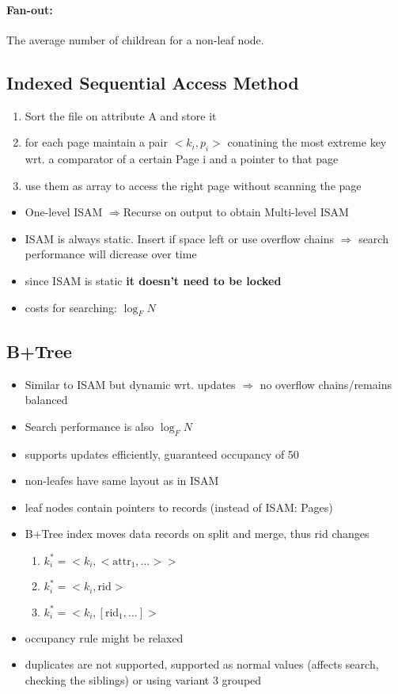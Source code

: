  \paragraph{Fan-out:} The average number of childrean for a non-leaf node.
 
 \subsection{Indexed Sequential Access Method}

  \begin{enumerate}
     \item Sort the file on attribute A and store it
     \item for each page maintain a pair $<k_i,p_i>$ conatining the most extreme key wrt. a comparator of a certain Page i and a pointer to that page
     \item use them as array to access the right page without scanning the page
 \end{enumerate}
 \begin{itemize}
    \item One-level ISAM $\Rightarrow$Recurse on output to obtain Multi-level ISAM
     \item ISAM is always static. Insert if space left or use overflow chains $\Rightarrow$ search performance will dicrease over time
     \item since ISAM is static \textbf{it doesn't need to be locked}
     \item costs for searching: $\log_F N$
 \end{itemize}

 \subsection{B+Tree}
\begin{itemize}
    \item Similar to ISAM but dynamic wrt. updates $\Rightarrow$ no overflow chains/remains balanced
    \item Search performance is also $\log_F N$
    \item supports updates efficiently, guaranteed occupancy of 50%
    \item non-leafes have same layout as in ISAM
    \item leaf nodes contain pointers to records (instead of ISAM: Pages)
    \item B+Tree index moves data records on split and merge, thus rid changes
    \begin{enumerate}
        \item $k_i^* = <k_i,<\text{attr}_1, \dots>>$
        \item $k_i^* = <k_i, \text{rid}>$
        \item $k_i^* = <k_i, [\text{rid}_1, \dots]>$
    \end{enumerate}
    \item occupancy rule might be relaxed
    \item duplicates are not supported, supported as normal values (affects search, checking the siblings) or using variant 3 grouped
\end{itemize}
 
